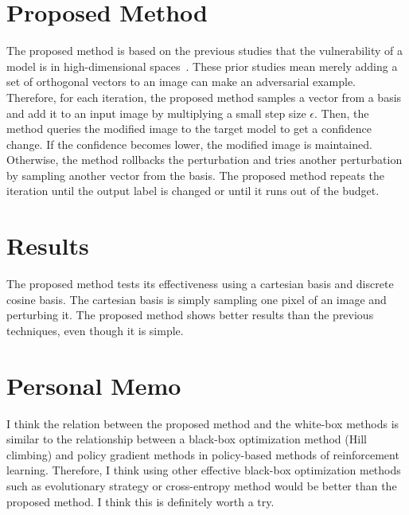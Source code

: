\documentclass[10pt,twocolumn,letterpaper]{article}
\begin{document}
\section{Proposed Method}
The proposed method is based on the previous studies that the vulnerability of a model is in high-dimensional spaces~\cite{Inevit1, Inevit2}. These prior studies mean merely adding a set of orthogonal vectors to an image can make an adversarial example. Therefore, for each iteration, the proposed method samples a vector from a basis and add it to an input image by multiplying a small step size $\epsilon$. Then, the method queries the modified image to the target model to get a confidence change. If the confidence becomes lower, the modified image is maintained. Otherwise, the method rollbacks the perturbation and tries another perturbation by sampling another vector from the basis. The proposed method repeats the iteration until the output label is changed or until it runs out of the budget.

\section{Results}
The proposed method tests its effectiveness using a cartesian basis and discrete cosine basis. The cartesian basis is simply sampling one pixel of an image and perturbing it. The proposed method shows better results than the previous techniques, even though it is simple.

\section{Personal Memo}
I think the relation between the proposed method and the white-box methods is similar to the relationship between a black-box optimization method (Hill climbing) and policy gradient methods in policy-based methods of reinforcement learning. Therefore, I think using other effective black-box optimization methods such as evolutionary strategy or cross-entropy method would be better than the proposed method. I think this is definitely worth a try.


{\small


}
\end{document}

